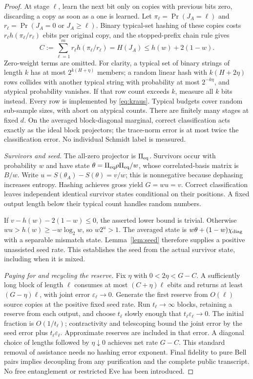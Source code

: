 \documentclass[11pt]{article}
\begin{document}
\begin{proof}
At stage $\ell$, learn the next bit only on copies with previous
bits zero, discarding a copy as soon as a one is learned. Let
$\pi_\ell=\Pr(J_A=\ell)$ and
$r_\ell=\Pr(J_A=0\text{ or }J_A\ge\ell)$. Binary typical-set hashing
of these copies costs $r_\ell h(\pi_\ell/r_\ell)$ ebits per original
copy, and the stopped-prefix chain rule gives
\begin{equation}\label{eq:prefix}
 C:=\sum_{\ell=1}^m r_\ell h(\pi_\ell/r_\ell)
   =H(J_A)\le h(w)+2(1-w).
\end{equation}
Zero-weight terms are omitted. For clarity, a typical set of binary
strings of length $k$ has at most $2^{k(H+\eta)}$ members; a random
linear hash with $k(H+2\eta)$ rows collides with another typical string
with probability at most $2^{-k\eta}$, and atypical probability vanishes.
If that row count exceeds $k$, measure all $k$ bits instead. Every row
is implemented by \eqref{eq:kraus}. Typical budgets cover random
sub-sample sizes, with abort on atypical counts. There are finitely
many stages at fixed $d$. On the averaged block-diagonal marginal,
correct classification acts exactly as the ideal block projectors;
the trace-norm error is at most twice the classification error.
No individual Schmidt label is measured.

\emph{Survivors and seed.} The all-zero projector is $\Pi_{\rm eq}$.
Survivors occur with probability $w$ and have state
$\theta=\Pi_{\rm eq}\rho\Pi_{\rm eq}/w$, whose correlated-basis matrix
is $B/w$. Write $u=S(\theta_A)-S(\theta)=v/w$; this is nonnegative
because dephasing increases entropy. Hashing \cite[Theorem 10]{dw}
achieves gross yield $G=wu=v$. Correct classification leaves independent
identical survivor states conditional on their positions. A fixed
output length below their typical count handles random numbers.

If $v-h(w)-2(1-w)\le0$, the asserted lower bound is trivial.
Otherwise $wu>h(w)\ge-w\log_2w$, so $w2^u>1$.
The averaged state is $w\theta+(1-w)\chi_{\rm diag}$ with a separable
mismatch state. Lemma~\ref{lem:seed} therefore supplies a positive
unassisted seed rate. This establishes the seed from the actual
survivor state, including when it is mixed.

\emph{Paying for and recycling the reserve.} Fix $\eta$ with
$0<2\eta<G-C$. A sufficiently long block of length $\ell$ consumes
at most $(C+\eta)\ell$ ebits and returns at least $(G-\eta)\ell$,
with joint error $\varepsilon_\ell\to0$. Generate the first reserve
from $O(\ell)$ source copies at the positive fixed seed rate. Run
$t_\ell\to\infty$ blocks, retaining a reserve from each output,
and choose $t_\ell$ slowly enough that $t_\ell\varepsilon_\ell\to0$.
The initial fraction is $O(1/t_\ell)$; contractivity and telescoping
bound the joint error by the seed error plus $t_\ell\varepsilon_\ell$.
Approximate reserves are included in that error. A diagonal choice of
lengths followed by $\eta\downarrow0$ achieves net rate $G-C$.
This standard removal of assistance \cite[Section V]{vv} needs no
hashing error exponent. Final fidelity to pure Bell pairs implies
decoupling from any purification and the complete public transcript.
No free entanglement or restricted Eve has been introduced.


\end{proof}
\end{document}
